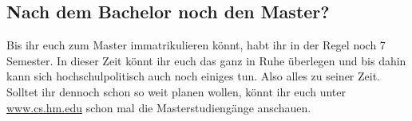\subsection{Nach dem Bachelor noch den Master?}
Bis ihr euch zum Master immatrikulieren könnt, habt ihr in der Regel 
noch 7 Semester. In dieser Zeit könnt ihr euch das ganz in Ruhe 
überlegen und bis dahin kann sich hochschulpolitisch auch noch einiges 
tun. Also alles zu seiner Zeit. Solltet ihr dennoch schon so weit planen 
wollen, könnt ihr euch unter \url{www.cs.hm.edu} \arrow {} schon 
mal die Masterstudiengänge anschauen.